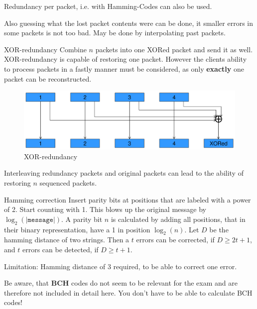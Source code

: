 \documentclass[english]{panikzettel}
\begin{document}
	Redundancy per packet, i.e. with Hamming-Codes can also be used.

	Also guessing what the lost packet contents were can be done, it smaller errors in some packets is not too bad. May be done by interpolating past packets.

	\begin{defi}{XOR-redundancy}
		Combine \( n \) packets into one XORed packet and send it as well.
		XOR-redundancy is capable of restoring one packet.
		However the clients ability to process packets in a fastly manner must be considered, as only \textbf{exactly} one packet can be reconstructed.
	\end{defi}

	\begin{figure}[H]
		\centering
		\includegraphics[width=\textwidth]{img/2-xor-redundancy.png}
		\caption{XOR-redundancy}
		\label{img-2-xor-redundancy}
	\end{figure}	

	Interleaving redundancy packets and original packets can lead to the ability of restoring \( n \) sequenced packets.
	
	\begin{defi}{Hamming correction}
		Insert parity bits at positions that are labeled with a power of 2.
		Start counting with 1.
		This blows up the original message by \( \log_2(|\texttt{message}|) \).
		A parity bit \( n \) is calculated by adding all positions, that in their binary representation, have a 1 in position \( \log_2(n) \).
		\tcblower
		Let \( D \) be the hamming distance of two strings.
		Then a \( t \) errors can be corrected, if \( D \geq 2t + 1 \), and \( t \) errors can be detected, if \( D \geq t + 1 \).
	\end{defi}

	Limitation: Hamming distance of 3 required, to be able to correct one error.

	\begin{alertbox}
		Be aware, that \textbf{BCH} codes do not seem to be relevant for the exam and are therefore not included in detail here.
		\tcblower
		You don't have to be able to calculate BCH codes!
	\end{alertbox}
\end{document}
